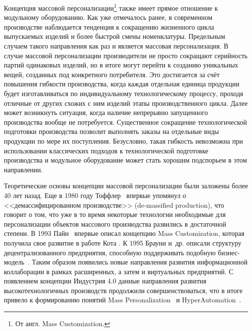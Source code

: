 Концепция массовой персонализации\footnote{От англ. Mass Customization.} также имеет прямое отношение к модульному оборудованию. Как уже отмечалось ранее, в современном производстве наблюдается тенденция к сокращению жизненного цикла выпускаемых изделий и более быстрой смены номенклатуры. Предельным случаем такого направления как раз и является массовая персонализация. В случае массовой персонализации производители не просто сокращают серийность партий одинаковых изделий, но в итоге могут перейти к созданию уникальных вещей, созданных под конкретного потребителя. Это достигается за счёт повышения гибкости производства, когда каждая отдельная единица продукции будет изготавливаться по индивидуальному технологическому процессу, проходя отличные от других схожих с ним изделий этапы производственного цикла. Далее может возникнуть ситуация, когда наличие непрерывно запущенного производства вообще не потребуется. Существенное сокращение технологической подготовки производства позволит выполнять заказы на отдельные виды продукции по мере их поступления. Безусловно, такая гибкость невозможна при использовании классических подходов к технологической подготовке производства и модульное оборудование может стать хорошим подспорьем в этом направлении.

Теоретические основы концепции массовой персонализации были заложены более 40 лет назад. Еще в 1980 году Тоффлер~\cite{toffler1980third} впервые упомянул о <<демассифицированном производстве>> (de-massified production), что говорит о том, что уже в то время некоторые технологии необходимые для персонализации объектов массового производства развились в достаточной степени. В 1993 Пайн~\cite{pine1993mass} впервые описал концепцию Mass Customization, которая получила свое развитие в работе Кота \cite{kotha1995mass}. К 1995 Брауни и~др. описали структуру децентрализованного предприятия, способную поддерживать подобную бизнес-модель~\cite{browne1995future}. Таким образом появились новые направления развития информационной коллаборации в рамках расширенных, а затем и виртуальных предприятий. С появлением концепции Индустрия 4.0 данные направления развития высокотехнологичных производств продолжили совершенствоваться, что в итоге привело к формированию понятий Mass Personalization~\cite{chen2009mass} и HyperAutomation~\cite{park2018fourth}.

